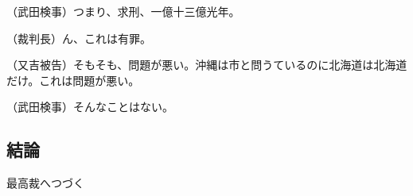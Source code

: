 （武田検事）つまり、求刑、一億十三億光年。\par
（裁判長）ん、これは有罪。\par
（又吉被告）そもそも、問題が悪い。沖縄は市と問うているのに北海道は北海道だけ。これは問題が悪い。\par
（武田検事）そんなことはない。\par

\subsection{結論}
最高裁へつづく
